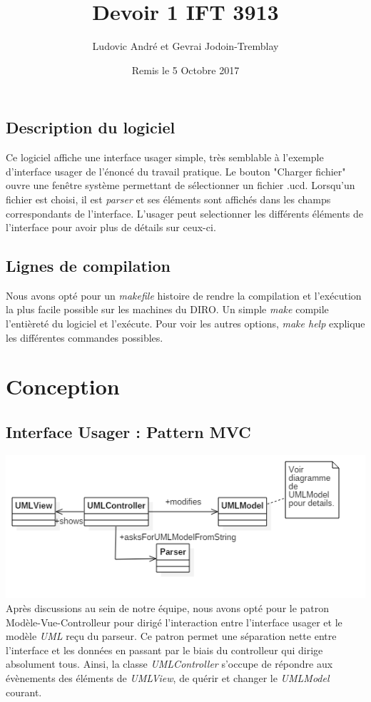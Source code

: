 \documentclass[letter,french]{report}
\begin{document}
	\title{Devoir 1 IFT 3913}
	\author{Ludovic André et Gevrai Jodoin-Tremblay}
	\date{Remis le 5 Octobre 2017}
	\maketitle
	
	
	\subsection*{Description du logiciel}
	Ce logiciel affiche une interface usager simple, très semblable
	à l'exemple d'interface usager de l'énoncé du travail pratique. Le bouton "Charger
	fichier" ouvre une fenêtre système permettant de sélectionner un fichier .ucd.
	Lorsqu'un fichier est choisi, il est \emph{parser} et ses éléments sont affichés dans
	les champs correspondants de l'interface. L'usager peut selectionner les
  différents éléments de l'interface pour avoir plus de détails sur ceux-ci.
	
	\subsection*{Lignes de compilation}
	Nous avons opté pour un \emph{makefile} histoire de rendre la compilation et l'exécution
	la plus facile possible sur les machines du DIRO. Un simple \emph{make} compile
	l'entièreté du logiciel et l'exécute. Pour voir les autres options, \emph{make help}
	explique les différentes commandes possibles.
	
	\section*{Conception}
	
	\subsection*{Interface Usager : Pattern MVC}
	\includegraphics[scale=.7]{MVC_diagram.png}
  Après discussions au sein de notre équipe, nous avons opté pour le
  patron Modèle-Vue-Controlleur pour dirigé l'interaction entre l'interface
  usager et le modèle \emph{UML} reçu du parseur. Ce patron permet une
  séparation nette entre l'interface et les données en passant par le biais du
  controlleur qui dirige absolument tous. Ainsi, la classe \emph{UMLController}
  s'occupe de répondre aux évènements des éléments de \emph{UMLView}, de
  quérir et changer le \emph{UMLModel} courant.
\end{document}
